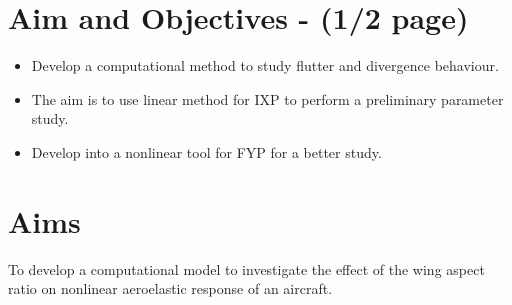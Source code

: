 \documentclass[11pt]{article}
\begin{document}
\section{Aim and Objectives - (1/2 page)}
\begin{itemize}
    \item Develop a computational method to study flutter and divergence behaviour.
    \item The aim is to use linear method for IXP to perform a preliminary parameter study.
    \item Develop into a nonlinear tool for FYP for a better study.
\end{itemize}
\section*{Aims}
To develop a computational model to investigate the effect of the wing aspect ratio on nonlinear aeroelastic response of an aircraft. 
\end{document}
